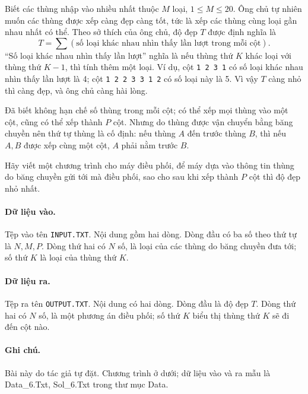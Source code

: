 \documentclass[11pt]{article}
\begin{document}
Biết các thùng nhập vào nhiều nhất thuộc \(M\) loại, \(1\le M\le 20\). Ông
chủ tự nhiên muốn các thùng được xếp càng đẹp càng tốt, tức là xếp các thùng
cùng loại gần nhau nhất có thể. Theo sở thích của ông chủ, độ đẹp \(T\) được
định nghĩa là
\[
  T=\sum(\text{số loại khác nhau nhìn thấy lần lượt trong mỗi cột}).
\]
``Số loại khác nhau nhìn thấy lần lượt'' nghĩa là nếu thùng thứ \(K\) khác
loại với thùng thứ \(K-1\), thì tính thêm một loại. Ví dụ, cột
\texttt{1 2 3 1} có số loại khác nhau nhìn thấy lần lượt là 4; cột
\texttt{1 2 2 3 3 1 2} có số loại này là 5. Vì vậy \(T\) càng nhỏ thì càng
đẹp, và ông chủ càng hài lòng.

Đã biết không hạn chế số thùng trong mỗi cột; có thể xếp mọi thùng vào một
cột, cũng có thể xếp thành \(P\) cột. Nhưng do thùng được vận chuyển bằng
băng chuyền nên thứ tự thùng là cố định: nếu thùng \(A\) đến trước thùng
\(B\), thì nếu \(A,B\) được xếp cùng một cột, \(A\) phải nằm trước \(B\).

Hãy viết một chương trình cho máy điều phối, để máy dựa vào thông tin thùng
do băng chuyền gửi tới mà điều phối, sao cho sau khi xếp thành \(P\) cột thì
độ đẹp nhỏ nhất.

\paragraph{Dữ liệu vào.}
Tệp vào tên \texttt{INPUT.TXT}. Nội dung gồm hai dòng. Dòng đầu có ba số theo
thứ tự là \(N,M,P\). Dòng thứ hai có \(N\) số, là loại của các thùng do băng
chuyền đưa tới; số thứ \(K\) là loại của thùng thứ \(K\).

\paragraph{Dữ liệu ra.}
Tệp ra tên \texttt{OUTPUT.TXT}. Nội dung có hai dòng. Dòng đầu là độ đẹp
\(T\). Dòng thứ hai có \(N\) số, là một phương án điều phối; số thứ \(K\) biểu
thị thùng thứ \(K\) sẽ đi đến cột nào.

\paragraph{Ghi chú.}
Bài này do tác giả tự đặt. Chương trình ở dưới; dữ liệu vào và ra mẫu là
Data\_6.Txt, Sol\_6.Txt trong thư mục Data.
\end{document}
